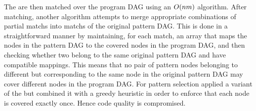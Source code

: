 %
%

The \tpartialPatterns are then matched over the \gls{program DAG} using an
\mbox{$O(nm)$} algorithm.
%
After matching, another algorithm attempts to
merge appropriate combinations of partial \glspl{match} into \glspl{match} of
the original \gls{pattern DAG}.
%
This is done in a straightforward manner by
maintaining, for each \gls{match}, an array that maps the \glspl{node} in the
\gls{pattern DAG} to the covered \glspl{node} in the \gls{program DAG}, and then
checking whether two \tpartialPatterns belong to the same original \gls{pattern
  DAG} and have compatible mappings.
%
This means that no pair of \gls{pattern}
\glspl{node} belonging to different \tpartialPatterns but corresponding to the
same \gls{node} in the original \gls{pattern DAG} may cover different
\glspl{node} in the \gls{program DAG}.
%
For \gls{pattern selection}
\citeauthor{Arnold1999b} applied a variant of the \tDPscheme but combined it
with a greedy heuristic in order to enforce that each \gls{node} is covered
exactly once.
%
Hence code quality is compromised.


